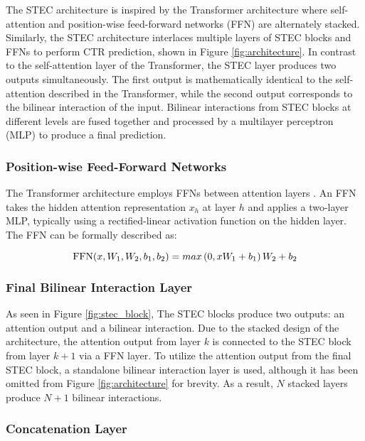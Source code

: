 \documentclass{article}
\begin{document}
The STEC architecture is inspired by the Transformer architecture where self-attention and position-wise feed-forward networks (FFN) are alternately stacked. Similarly, the STEC architecture interlaces multiple layers of STEC blocks and FFNs to perform CTR prediction, shown in Figure \ref{fig:architecture}. In contrast to the self-attention layer of the Transformer, the STEC layer produces two outputs simultaneously. The first output is mathematically identical to the self-attention described in the Transformer, while the second output corresponds to the bilinear interaction of the input. Bilinear interactions from STEC blocks at different levels are fused together and processed by a multilayer perceptron (MLP) to produce a final prediction.

\subsubsection{Position-wise Feed-Forward Networks}

The Transformer architecture employs FFNs between attention layers \cite{vaswani2023attention}. An FFN takes the hidden attention representation $x_h$ at layer $h$ and applies a two-layer MLP, typically using a rectified-linear activation function on the hidden layer. The FFN can be formally described as:

\begin{equation}
\textup{FFN}(x,W_1, W_2, b_1, b_2)=max\left (0, xW_1+b_1\right )W_2 +b_2
\end{equation}

\subsubsection{Final Bilinear Interaction Layer}

As seen in Figure \ref{fig:stec_block}, The STEC blocks produce two outputs: an attention output and a bilinear interaction. Due to the stacked design of the architecture, the attention output from layer $k$ is connected to the STEC block from layer $k + 1$ via a FFN layer. To utilize the attention output from the final STEC block, a standalone bilinear interaction layer is used, although it has been omitted from Figure \ref{fig:architecture} for brevity. As a result, $N$ stacked layers produce $N + 1$ bilinear interactions.

\subsubsection{Concatenation Layer}
\end{document}
